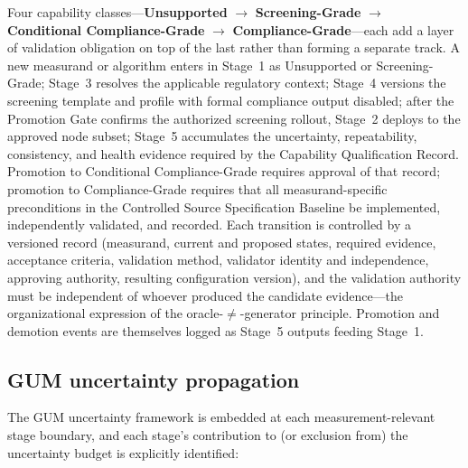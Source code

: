 \documentclass[11pt,a4paper]{article}
\begin{document}
Four capability classes---\textbf{Unsupported} $\rightarrow$ \textbf{Screening-Grade}
$\rightarrow$ \textbf{Conditional Compliance-Grade} $\rightarrow$
\textbf{Compliance-Grade}---each add a layer of validation obligation on top of the last rather
than forming a separate track. A new measurand or algorithm enters in Stage~1 as Unsupported or
Screening-Grade; Stage~3 resolves the applicable regulatory context; Stage~4 versions the
screening template and profile with formal compliance output disabled; after the Promotion Gate
confirms the authorized screening rollout, Stage~2 deploys to the approved node subset; Stage~5
accumulates the uncertainty, repeatability, consistency, and health evidence required by the
Capability Qualification Record. Promotion to Conditional Compliance-Grade requires approval of
that record; promotion to Compliance-Grade requires that all measurand-specific preconditions in
the Controlled Source Specification Baseline be implemented, independently validated, and
recorded. Each transition is controlled by a versioned record (measurand, current and proposed
states, required evidence, acceptance criteria, validation method, validator identity and
independence, approving authority, resulting configuration version), and the validation authority
must be independent of whoever produced the candidate evidence---the organizational expression of
the oracle-$\neq$-generator principle. Promotion and demotion events are themselves logged as
Stage~5 outputs feeding Stage~1.

\subsection{GUM uncertainty propagation}
\label{sec:gum}

The GUM uncertainty framework is embedded at each measurement-relevant stage boundary, and each
stage's contribution to (or exclusion from) the uncertainty budget is explicitly identified:
\end{document}
